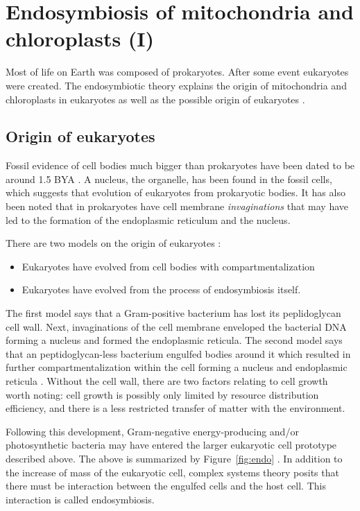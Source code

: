 \chapter{Endosymbiosis of mitochondria and chloroplasts (I)}

Most of life on Earth was composed of prokaryotes.
After some event eukaryotes were created.
The endosymbiotic theory explains the origin of mitochondria and chloroplasts in eukaryotes as well as the possible origin of eukaryotes \cite{endo, biomain}.

\section{Origin of eukaryotes}
Fossil evidence of cell bodies much bigger than prokaryotes have been dated to be around 1.5 BYA \cite{biomain}.
A nucleus, the organelle, has been found in the fossil cells, which suggests that evolution of eukaryotes from prokaryotic bodies.
It has also been noted that in prokaryotes have cell membrane \emph{invaginations} that may have led to the formation of the endoplasmic reticulum and the nucleus.

There are two models on the origin of eukaryotes \cite{endo}:

\begin{itemize}
    \item Eukaryotes have evolved from cell bodies with compartmentalization
    \item Eukaryotes have evolved from the process of endosymbiosis itself.
\end{itemize}

The first model says that a Gram-positive bacterium has lost its peplidoglycan cell wall.
Next, invaginations of the cell membrane enveloped the bacterial DNA forming a nucleus and formed the endoplasmic reticula.
The second model says that an peptidoglycan-less bacterium engulfed bodies around it which resulted in further compartmentalization within the cell forming a nucleus and endoplasmic reticula \cite{endo}.
Without the cell wall, there are two factors relating to cell growth worth noting: cell growth is possibly only limited by resource distribution efficiency, and there is a less restricted transfer of matter with the environment.

Following this development, Gram-negative energy-producing and/or photosynthetic bacteria may have entered the larger eukaryotic cell prototype described above.
The above is summarized by Figure~\ref{fig:endo} \cite{endo}.
In addition to the increase of mass of the eukaryotic cell, complex systems theory posits that there must be interaction between the engulfed cells and the host cell.
This interaction is called endosymbiosis.

